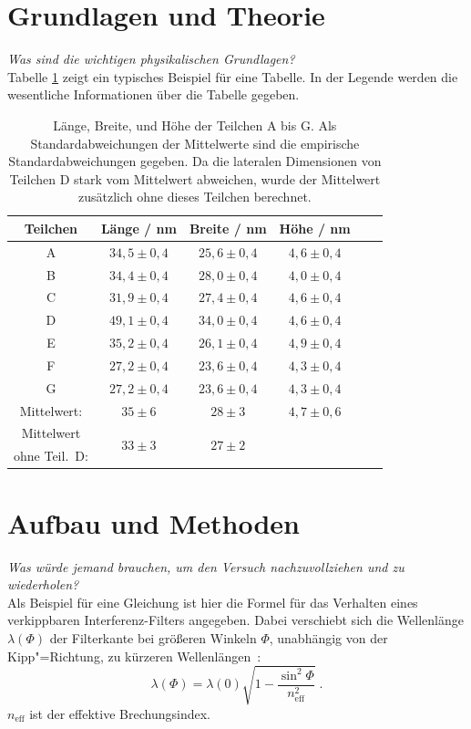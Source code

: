 \documentclass[11pt,a4paper]{scrartcl}
\begin{document}
\section{Grundlagen und Theorie}
\label{sec:Grundlagen}
%
\textit{Was sind die wichtigen physikalischen Grundlagen?}\\
Tabelle \ref{tab:exapltab} zeigt ein typisches Beispiel für eine Tabelle. In der Legende werden die wesentliche Informationen über die Tabelle gegeben.
\begin{table}[htbp]
\centering
\caption{\label{tab:exapltab} Länge, Breite, und Höhe der Teilchen A bis G. Als Standardabweichungen der Mittelwerte sind die empirische Standardabweichungen gegeben. Da die lateralen Dimensionen von Teilchen D stark vom Mittelwert abweichen, wurde der Mittelwert zusätzlich ohne dieses Teilchen berechnet.}
\begin{tabular}{cccccc}
\toprule
\multicolumn{1}{c}{Teilchen}	& \multicolumn{1}{c}{Länge / \si{\nano\meter}}		& \multicolumn{1}{c}{Breite / \si{\nano\meter}}	& \multicolumn{1}{c}{Höhe / \si{\nano\meter}} \\
\midrule
\multirow{1}{*}{A} & $34,5\pm0,4$	& $25,6\pm0,4$	& $4,6\pm0,4$\\
\multirow{1}{*}{B} & $34,4\pm0,4$	& $28,0\pm0,4$	& $4,0\pm0,4$\\
\multirow{1}{*}{C} & $31,9\pm0,4$	& $27,4\pm0,4$	& $4,6\pm0,4$\\
\multirow{1}{*}{D} & $49,1\pm0,4$	& $34,0\pm0,4$	& $4,6\pm0,4$\\
\multirow{1}{*}{E} & $35,2\pm0,4$	& $26,1\pm0,4$	& $4,9\pm0,4$\\
\multirow{1}{*}{F} & $27,2\pm0,4$	& $23,6\pm0,4$	& $4,3\pm0,4$\\  
\multirow{1}{*}{G} & $27,2\pm0,4$	& $23,6\pm0,4$	& $4,3\pm0,4$\\
\midrule
\multirow{1}{*}{Mittelwert:} & $35\pm6$	& $28\pm3$		& $4,7\pm0,6$	\\	  
\multirow{1}{*}{Mittelwert} & \multirow{2}{*}{$33\pm3$}	& \multirow{2}{*}{$27\pm2$}		& \multirow{2}{*}{}	\\	  
\multirow{1}{*}{ohne Teil.\ D:} & 	& & \\	  
\bottomrule
\end{tabular}
\end{table}
%
\section{Aufbau und Methoden}
\label{sec:ExpAufb}
%
\textit{Was würde jemand brauchen, um den Versuch nachzuvollziehen und zu wiederholen?}\\
Als Beispiel für eine Gleichung ist hier die Formel für das Verhalten eines verkippbaren Interferenz-Filters angegeben. Dabei verschiebt sich die Wellenlänge $\lambda\left(\Phi\right)$ der Filterkante bei größeren Winkeln $\Phi$, unabhängig von der Kipp"=Richtung, zu kürzeren Wellenlängen~\cite{TiltFilter}:
\begin{equation}
\lambda\left(\Phi\right)=\lambda\left(0\right)\sqrt{1-\frac{\sin^2\Phi}{n_\text{eff}^2}}\;.
\label{eq:TiltWel}
\end{equation}
$n_\text{eff}$ ist der effektive Brechungsindex.
%
\end{document}
